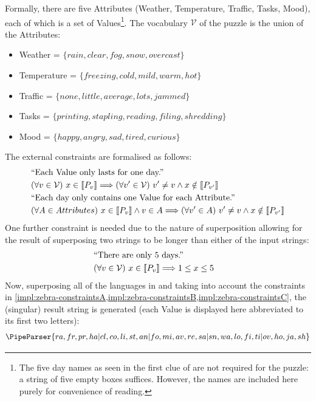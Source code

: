 \documentclass[a4paper,12pt,leqno]{article}
\newcommand{\vph}[1]{\vphantom{#1}}
\newcommand{\ebox}[1]{\fbox{$\vph{'(),}#1$}}
\newcommand{\V}{\mathcal{V}}
\newcommand{\EventString}[1]{%
	\renewcommand*{\do}[1]{\ebox{##1}}%
	\PipeParser{#1}%
}
\begin{document}
Formally, there are five Attributes (Weather, Temperature, Traffic, Tasks, Mood), each of which is a set of Values\footnote{The five day names as seen in the first clue of  are not required for the puzzle: a string of five empty boxes suffices. However, the names are included here purely for convenience of reading.}. The vocabulary $\V$ of the puzzle is the union of the Attributes:
\begin{itemize}
	\item Weather = $\{rain,clear,fog,snow,overcast\}$
	\item Temperature = $\{freezing,cold,mild,warm,hot\}$
	\item Traffic = $\{none,little,average,lots,jammed\}$
	\item Tasks = $\{printing,stapling,reading,filing,shredding\}$
	\item Mood = $\{happy,angry,sad,tired,curious\}$
\end{itemize}
The external constraints are formalised as follows:
\begin{align}
	&\text{``Each Value only lasts for one day.''}\notag\\
	&(\forall v \in \V)~ x \in \llbracket P_v \rrbracket \Longrightarrow (\forall v' \in \V)~ v' \neq v \wedge x \notin \llbracket P_{v'} \rrbracket\label{impl:zebra-constraintsA}\\
	&\text{``Each day only contains one Value for each Attribute.''}\notag\\
	&(\forall A \in Attributes)~ x \in \llbracket P_v \rrbracket \wedge v \in A \Longrightarrow (\forall v' \in A)~ v' \neq v \wedge x \notin \llbracket P_{v'} \rrbracket\label{impl:zebra-constraintsB}
\end{align}
One further constraint is needed due to the nature of superposition allowing for the result of superposing two strings to be longer than either of the input strings:
\begin{align}
	&\text{``There are only 5 days.''}&\notag\\
	&(\forall v \in \V)~ x \in \llbracket P_v \rrbracket \Longrightarrow 1 \leq x \leq 5\label{impl:zebra-constraintsC}
\end{align}
Now, superposing all of the languages in  and taking into account the constraints in \cref{impl:zebra-constraintsA,impl:zebra-constraintsB,impl:zebra-constraintsC}, the (singular) result string is generated (each Value is displayed here abbreviated to its first two letters):
\begin{align}
	\EventString{ra,fr,pr,ha|cl,co,li,st,an|fo,mi,av,re,sa|sn,wa,lo,fi,ti|ov,ho,ja,sh}
\end{align}
\end{document}
